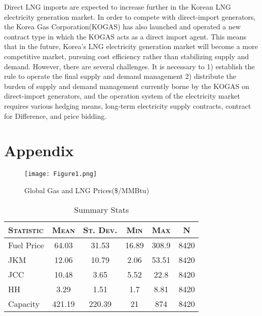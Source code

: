 \documentclass[12pt]{article}
\begin{document}
Direct LNG imports are expected to increase further in the Korean LNG electricity generation market. In order to compete with direct-import generators, the Korea Gas Corporation(KOGAS) has also launched and operated a new contract type in which the KOGAS acts as a direct import agent. This means that in the future, Korea's LNG electricity generation market will become a more competitive market, pursuing cost efficiency rather than stabilizing supply and demand. However, there are several challenges. It is necessary to 1) establish the rule to operate the final supply and demand management 2) distribute the burden of supply and demand management currently borne by the KOGAS on direct-import generators, and the operation system of the electricity market requires various hedging means, long-term electricity supply contracts, contract for Difference, and price bidding.






\newpage
\printbibliography





\newpage
\section{Appendix}

\begin{figure}[htbp] 
    \centering
            \caption{Global Gas and LNG Prices(\$/MMBtu)}
        \texttt{[image: Figure1.png]}
        \label{fig:88mono}
\end{figure}




\begin{table}[htbp]\centering
\def\sym#1{\ifmmode^{#1}\else\(^{#1}\)\fi}
\caption{Summary Stats}
\begin{tabular}{l*{1}{ccccc}}
\toprule
\addlinespace
\textsc{Statistic}            &        \multicolumn{1}{c}{\textsc{Mean}}&         \multicolumn{1}{c}{\textsc{St. Dev.}}&        \multicolumn{1}{c}{\textsc{Min}}&         \multicolumn{1}{c}{\textsc{Max}}&           \multicolumn{1}{c}{\textsc{N}}\\
\hline \hline
\addlinespace
Fuel Price       &    64.03&    31.53&      16.89&       308.9&        8420\\
JKM         &    12.06&    10.79&       2.06&      53.51&        8420\\
JCC         &    10.48&    3.65&        5.52&        22.8&        8420\\
HH          &    3.29&    1.51&         1.7&        8.81&        8420\\
Capacity    &    421.19&    220.39&          21&         874&        8420\\
\bottomrule
\end{tabular}
\end{table}
\end{document}
